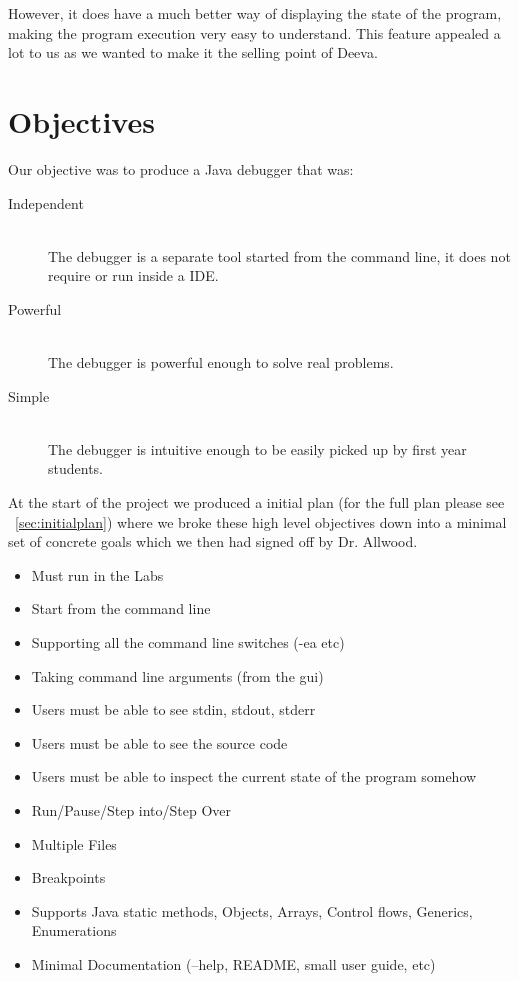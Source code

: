 \documentclass[11pt, a4paper]{article}
\begin{document}
However, it does have a much better way of displaying the state of the program, making the program execution very easy to understand. This feature appealed a lot to us as we wanted to make it the selling point of Deeva.


\section{Objectives}

Our objective was to produce a Java debugger that was:

\begin{description}
\item[Independent] \hfill \\
The debugger is a separate tool started from the command line, it does not require or run inside a IDE.
\item[Powerful] \hfill \\
The debugger is powerful enough to solve real problems.
\item[Simple] \hfill \\
The debugger is intuitive enough to be easily picked up by first year students.
\end{description}

At the start of the project we produced a initial plan (for the full plan please see ~\cref{sec:initialplan}) where we broke these high level objectives down into a minimal set of concrete goals which we then had signed off by Dr. Allwood.

\begin{itemize}
\item Must run in the Labs
\item Start from the command line
\item Supporting all the command line switches (-ea etc)
\item Taking command line arguments (from the gui)
\item Users must be able to see stdin, stdout, stderr
\item Users must be able to see the source code
\item Users must be able to inspect the current state of the program somehow
\item Run/Pause/Step into/Step Over
\item Multiple Files
\item Breakpoints
\item Supports Java static methods, Objects, Arrays, Control flows, Generics, Enumerations
\item Minimal Documentation (--help, README, small user guide, etc)
\end{itemize}
\end{document}
